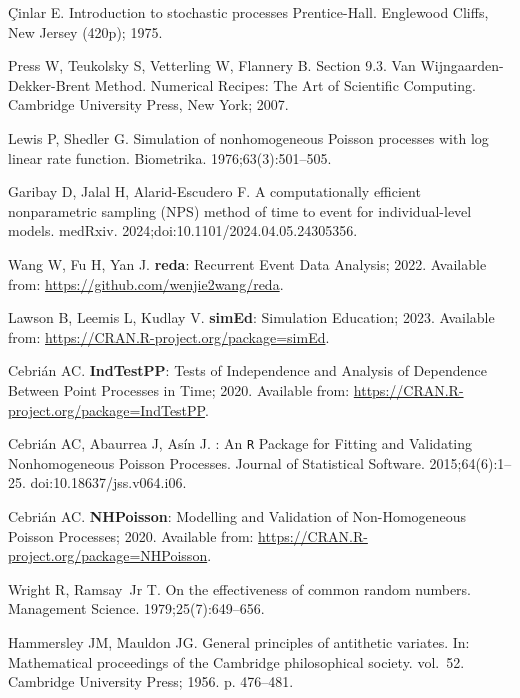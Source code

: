 \documentclass[10pt,letterpaper]{article}
\newcommand{\pkg}[1]{{\bf #1}}
\newcommand{\proglang}[1]{\texttt{#1}}
\begin{document}
\begin{thebibliography}{10}
\c{C}inlar E.
\newblock Introduction to stochastic processes Prentice-Hall.
\newblock Englewood Cliffs, New Jersey (420p); 1975.

Press W, Teukolsky S, Vetterling W, Flannery B.
\newblock Section 9.3. Van Wijngaarden-Dekker-Brent Method. Numerical Recipes: The Art of Scientific Computing.
\newblock Cambridge University Press, New York; 2007.

Lewis P, Shedler G.
\newblock Simulation of nonhomogeneous Poisson processes with log linear rate function.
\newblock Biometrika. 1976;63(3):501--505.

Garibay D, Jalal H, Alarid-Escudero F.
\newblock A computationally efficient nonparametric sampling (NPS) method of time to event for individual-level models.
\newblock medRxiv. 2024;doi:{10.1101/2024.04.05.24305356}.

Wang W, Fu H, Yan J. \pkg{reda}: {R}ecurrent Event Data Analysis; 2022.
\newblock Available from: \url{https://github.com/wenjie2wang/reda}.

Lawson B, Leemis L, Kudlay V. \pkg{simEd}: {S}imulation Education; 2023.
\newblock Available from: \url{https://CRAN.R-project.org/package=simEd}.

Cebrián AC. \pkg{IndTestPP}: {T}ests of Independence and Analysis of Dependence Between Point Processes in Time; 2020.
\newblock Available from: \url{https://CRAN.R-project.org/package=IndTestPP}.

Cebrián AC, Abaurrea J, Asín J.
\newblock \pkg{NHPoisson}: {A}n \proglang{R} Package for Fitting and Validating Nonhomogeneous Poisson Processes.
\newblock Journal of Statistical Software. 2015;64(6):1–25.
\newblock doi:{10.18637/jss.v064.i06}.

Cebrián AC. \pkg{NHPoisson}: {M}odelling and Validation of Non-Homogeneous Poisson Processes; 2020.
\newblock Available from: \url{https://CRAN.R-project.org/package=NHPoisson}.

Wright R, Ramsay~Jr T.
\newblock On the effectiveness of common random numbers.
\newblock Management Science. 1979;25(7):649--656.

Hammersley JM, Mauldon JG.
\newblock General principles of antithetic variates.
\newblock In: Mathematical proceedings of the Cambridge philosophical society. vol.~52. Cambridge University Press; 1956. p. 476--481.


\end{thebibliography}
\end{document}
